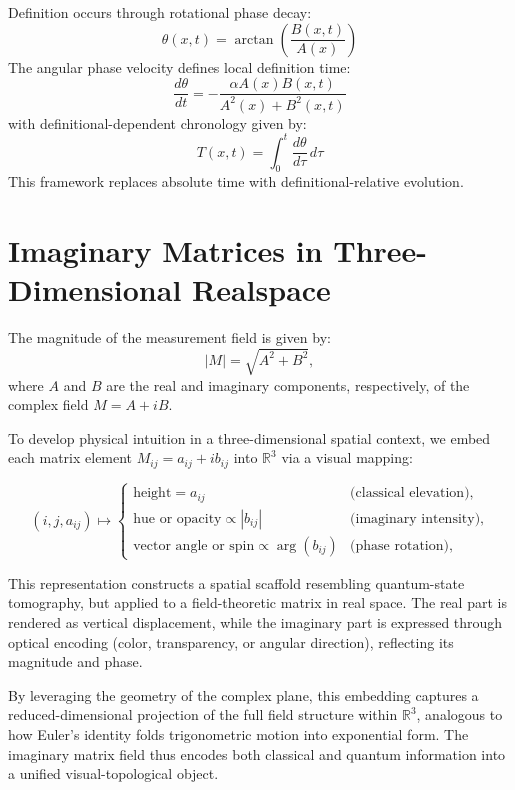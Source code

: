 Definition occurs through rotational phase decay:
\begin{equation}
\theta(x,t) = \arctan\left( \frac{B(x,t)}{A(x)} \right)
\end{equation}
The angular phase velocity defines local definition time:
\begin{equation}
\frac{d\theta}{dt} = -\frac{\alpha A(x) B(x,t)}{A^2(x) + B^2(x,t)}
\end{equation}
with definitional-dependent chronology given by:
\begin{equation}
T(x, t) = \int_0^t \frac{d\theta}{d\tau} \, d\tau
\end{equation}
This framework replaces absolute time with definitional-relative evolution.



\section{Imaginary Matrices in Three-Dimensional Realspace}

The magnitude of the measurement field is given by:
\[
|M| = \sqrt{A^2 + B^2},
\]
where \(A\) and \(B\) are the real and imaginary components, respectively, of the complex field \(M = A + iB\).

To develop physical intuition in a three-dimensional spatial context, we embed each matrix element \(M_{ij} = a_{ij} + i b_{ij}\) into \(\mathbb{R}^3\) via a visual mapping:

\[
(i,j,a_{ij}) \mapsto
\begin{cases}
  \text{height} = a_{ij} & \text{(classical elevation)},\\
  \text{hue or opacity} \propto |b_{ij}| & \text{(imaginary intensity)},\\
  \text{vector angle or spin} \propto \arg(b_{ij}) & \text{(phase rotation)},
\end{cases}
\]

This representation constructs a spatial scaffold resembling quantum-state tomography, but applied to a field-theoretic matrix in real space. The real part is rendered as vertical displacement, while the imaginary part is expressed through optical encoding (color, transparency, or angular direction), reflecting its magnitude and phase.

By leveraging the geometry of the complex plane, this embedding captures a reduced-dimensional projection of the full field structure within \(\mathbb{R}^3\), analogous to how Euler's identity folds trigonometric motion into exponential form. The imaginary matrix field thus encodes both classical and quantum information into a unified visual-topological object.


